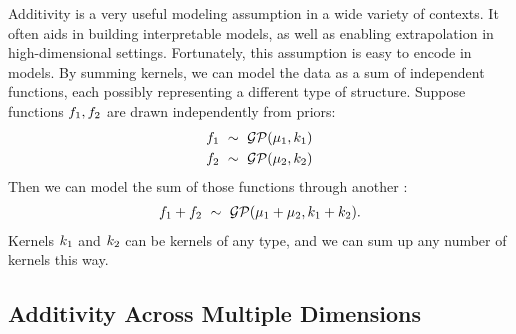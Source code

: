 Additivity is a very useful modeling assumption in a wide variety of contexts.  It often aids in building interpretable models, as well as enabling extrapolation in high-dimensional settings.
Fortunately, this assumption is easy to encode in \gp{} models.
By summing kernels, we can model the data as a sum of independent functions, each possibly representing a different type of structure.
Suppose functions ${f_1, f_2}$ are drawn independently from \gp{} priors:
%
\begin{align}
f_1 \ \sim\  \mathcal{GP}(\mu_1, k_1)\\
f_2 \ \sim\  \mathcal{GP}(\mu_2, k_2)
\end{align}
%
Then we can model the sum of those functions through another \gp{}:
%
\begin{align}
f_1 + f_2 \ \sim\  \mathcal{GP}(\mu_1 + \mu_2, k_1 + k_2).
\end{align}
%
Kernels $k_1$ and $k_2$ can be kernels of any type, and we can sum up any number of kernels this way.





\subsection{Additivity Across Multiple Dimensions}

